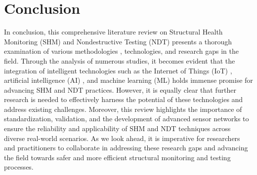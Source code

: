 \documentclass[journal, a4paper]{IEEEtran}
\begin{document}
\section{Conclusion}
In conclusion, this comprehensive literature review on Structural Health Monitoring (SHM)
and Nondestructive Testing (NDT) presents a thorough examination of various
methodologies \cite{de_menezes_defect_2021} \cite{tang_explainable_2023} \cite{wu_internal_2024} \cite{zhang_spatial_2023} \cite{zhang_structural_2021},
technologies, and research gaps in the field. Through the analysis of numerous studies,
it becomes evident that the integration of intelligent technologies such as the
Internet of Things (IoT) \cite{rehman_advancing_2024},
artificial intelligence (AI) \cite{moradi_intelligent_2023},
and machine learning (ML) holds immense promise for advancing SHM and NDT practices.
However, it is equally clear that further research is needed to effectively harness the potential of these technologies
and address existing challenges. Moreover, this review highlights the importance of standardization, validation,
and the development of advanced sensor networks to ensure the reliability and applicability of SHM and NDT
techniques across diverse real-world scenarios. As we look ahead, it is imperative for researchers and practitioners
to collaborate in addressing these research gaps and advancing the field towards safer and more efficient structural
monitoring and testing processes.




\ifCLASSOPTIONcaptionsoff
  \newpage
\fi






\end{document}
